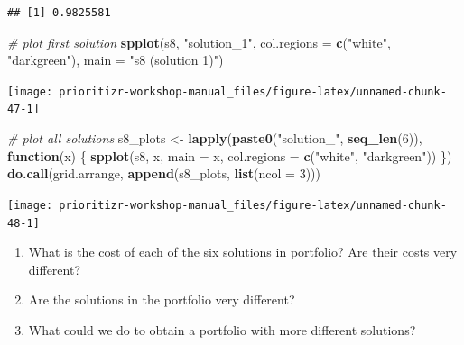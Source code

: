\documentclass[12pt,]{book}
\makeatletter
\newenvironment{Shaded}{\begin{snugshade}}{\end{snugshade}}
\newcommand{\CommentTok}[1]{\textcolor[rgb]{0.56,0.35,0.01}{\textit{#1}}}
\newcommand{\ControlFlowTok}[1]{\textcolor[rgb]{0.13,0.29,0.53}{\textbf{#1}}}
\newcommand{\DataTypeTok}[1]{\textcolor[rgb]{0.13,0.29,0.53}{#1}}
\newcommand{\DecValTok}[1]{\textcolor[rgb]{0.00,0.00,0.81}{#1}}
\newcommand{\KeywordTok}[1]{\textcolor[rgb]{0.13,0.29,0.53}{\textbf{#1}}}
\newcommand{\NormalTok}[1]{#1}
\newcommand{\StringTok}[1]{\textcolor[rgb]{0.31,0.60,0.02}{#1}}
\providecommand{\tightlist}{%
  \setlength{\itemsep}{0pt}\setlength{\parskip}{0pt}}
\newenvironment{kframe}{%
\medskip{}
\setlength{\fboxsep}{.8em}
 \def\at@end@of@kframe{}%
 \ifinner\ifhmode%
  \def\at@end@of@kframe{\end{minipage}}%
  \begin{minipage}{\columnwidth}%
 \fi\fi%
 \def\FrameCommand##1{\hskip\@totalleftmargin \hskip-\fboxsep
 \colorbox{shadecolor}{##1}\hskip-\fboxsep
     \hskip-\linewidth \hskip-\@totalleftmargin \hskip\columnwidth}%
 \MakeFramed {\advance\hsize-\width
   \@totalleftmargin\z@ \linewidth\hsize
   \@setminipage}}%
 {\par\unskip\endMakeFramed%
 \at@end@of@kframe}
\newenvironment{rmdblock}[1]
  {
  \begin{itemize}
  \renewcommand{\labelitemi}{
    \raisebox{-.7\height}[0pt][0pt]{
      {\setkeys{Gin}{width=3em,keepaspectratio}\texttt{[image: images/\#1]}}
    }
  }
  \setlength{\fboxsep}{1em}
  \begin{kframe}
  \item
  }
  {
  \end{kframe}
  \end{itemize}
  }
\newenvironment{rmdquestion}
  {\begin{rmdblock}{question}}
  {\end{rmdblock}}
\makeatother
\begin{document}
\begin{verbatim}
## [1] 0.9825581
\end{verbatim}

\begin{Shaded}
\begin{Highlighting}[]
\CommentTok{# plot first solution}
\KeywordTok{spplot}\NormalTok{(s8, }\StringTok{"solution_1"}\NormalTok{, }\DataTypeTok{col.regions =} \KeywordTok{c}\NormalTok{(}\StringTok{"white"}\NormalTok{, }\StringTok{"darkgreen"}\NormalTok{),}
       \DataTypeTok{main =} \StringTok{"s8 (solution 1)"}\NormalTok{)}
\end{Highlighting}
\end{Shaded}

\begin{center}\texttt{[image: prioritizr-workshop-manual\_files/figure-latex/unnamed-chunk-47-1]} \end{center}

\clearpage

\begin{Shaded}
\begin{Highlighting}[]
\CommentTok{# plot all solutions}
\NormalTok{s8_plots <-}\StringTok{ }\KeywordTok{lapply}\NormalTok{(}\KeywordTok{paste0}\NormalTok{(}\StringTok{"solution_"}\NormalTok{, }\KeywordTok{seq_len}\NormalTok{(}\DecValTok{6}\NormalTok{)), }\ControlFlowTok{function}\NormalTok{(x) \{}
  \KeywordTok{spplot}\NormalTok{(s8, x, }\DataTypeTok{main =}\NormalTok{ x, }\DataTypeTok{col.regions =} \KeywordTok{c}\NormalTok{(}\StringTok{"white"}\NormalTok{, }\StringTok{"darkgreen"}\NormalTok{))}
\NormalTok{\})}
\KeywordTok{do.call}\NormalTok{(grid.arrange, }\KeywordTok{append}\NormalTok{(s8_plots, }\KeywordTok{list}\NormalTok{(}\DataTypeTok{ncol =} \DecValTok{3}\NormalTok{)))}
\end{Highlighting}
\end{Shaded}

\begin{center}\texttt{[image: prioritizr-workshop-manual\_files/figure-latex/unnamed-chunk-48-1]} \end{center}

\begin{rmdquestion}
\begin{enumerate}
\def\labelenumi{\arabic{enumi}.}
\tightlist
\item
  What is the cost of each of the six solutions in portfolio? Are their costs very different?
\item
  Are the solutions in the portfolio very different?
\item
  What could we do to obtain a portfolio with more different solutions?
\end{enumerate}
\end{rmdquestion}
\end{document}
